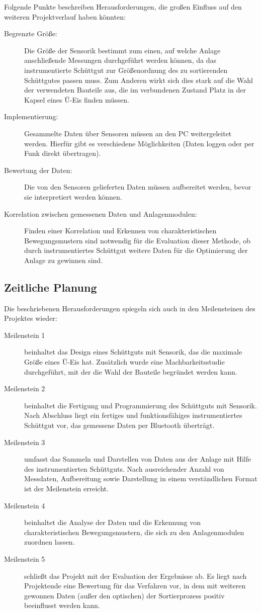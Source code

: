 Folgende Punkte beschreiben Herausforderungen, die großen Einfluss auf den weiteren Projektverlauf haben könnten:
\begin{description}
	\item [Begrenzte Größe:] Die Größe der Sensorik bestimmt zum einen, auf welche Anlage anschließende Messungen durchgeführt werden können, da das instrumentierte Schüttgut zur Größenordnung des zu sortierenden Schüttgutes passen muss. Zum Anderen wirkt sich dies stark auf die Wahl der verwendeten Bauteile aus, die im verbundenen Zustand Platz in der Kapsel eines Ü-Eis finden müssen.
	\item [Implementierung:] Gesammelte Daten über Sensoren müssen an den PC weitergeleitet werden. Hierfür gibt es verschiedene Möglichkeiten (Daten loggen oder per Funk direkt übertragen).
	\item [Bewertung der Daten:] Die von den Sensoren gelieferten Daten müssen aufbereitet werden, bevor sie interpretiert werden können.
	\item [Korrelation zwischen gemessenen Daten und Anlagenmodulen:] Finden einer Korrelation und Erkennen von charakteristischen Bewegungsmustern sind notwendig für die Evaluation dieser Methode, ob durch instrumentiertes Schüttgut weitere Daten für die Optimierung der Anlage zu gewinnen sind. 
\end{description} 

\subsection{Zeitliche Planung}
Die beschriebenen Herausforderungen spiegeln sich auch in den Meilensteinen des Projektes wieder:
\begin{description}
	\item [Meilenstein 1] beinhaltet das Design eines Schüttguts mit Sensorik, das die maximale Größe eines Ü-Eis hat. Zusätzlich wurde eine Machbarkeitsstudie durchgeführt, mit der die Wahl der Bauteile begründet werden kann.
	\item [Meilenstein 2] beinhaltet die Fertigung und Programmierung des Schüttguts mit Sensorik. Nach Abschluss liegt ein fertiges und funktionsfähiges instrumentiertes Schüttgut vor, das gemessene Daten per Bluetooth überträgt.
	\item [Meilenstein 3] umfasst das Sammeln und Darstellen von Daten aus der Anlage mit Hilfe des instrumentierten Schüttguts. Nach ausreichender Anzahl von Messdaten, Aufbereitung sowie Darstellung in einem verständlichen Format ist der Meilenstein erreicht.
	\item [Meilenstein 4] beinhaltet die Analyse der Daten und die Erkennung von charakteristischen Bewegungsmustern, die sich zu den Anlagenmodulen zuordnen lassen.
	\item [Meilenstein 5] schließt das Projekt mit der Evaluation der Ergebnisse ab. Es liegt nach Projektende eine Bewertung für das Verfahren vor, in dem mit  weiteren gewonnen Daten (außer den optischen) der Sortierprozess positiv beeinflusst werden kann.
\end{description}
	
